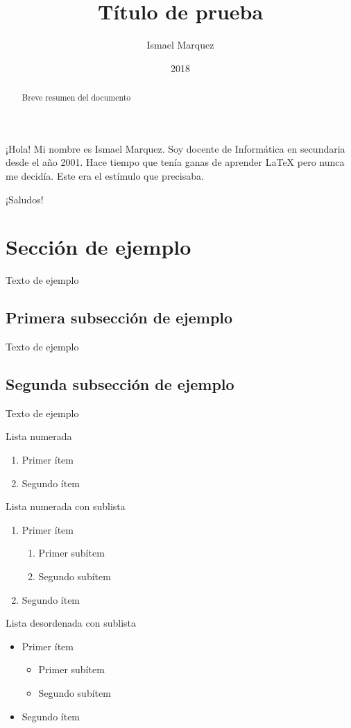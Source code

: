 \documentclass[a4paper,11pt]{article}
\title{\textbf{Título de prueba}}
\author{Ismael Marquez}
\date{2018}
\begin{document}
\maketitle
\thispagestyle{fancy}
\begin{abstract}
Breve resumen del documento
\end{abstract}

¡Hola! Mi nombre es Ismael Marquez. Soy docente de Informática en secundaria desde el año 2001. Hace tiempo que tenía ganas de aprender {\LaTeX} pero nunca me decidía. Este era el estímulo que precisaba.

¡Saludos!

\section{Sección de ejemplo}
Texto de ejemplo
\subsection{Primera subsección de ejemplo}
Texto de ejemplo
\subsection{Segunda subsección de ejemplo}
Texto de ejemplo

Lista numerada
\begin{enumerate}
\item Primer ítem
\item Segundo ítem
\end{enumerate}

Lista numerada con sublista
\begin{enumerate}
\item Primer ítem
\begin{enumerate}
\item Primer subítem
\item Segundo subítem
\end{enumerate}
\item Segundo ítem
\end{enumerate}

Lista desordenada con sublista
\begin{itemize}
\item Primer ítem
\begin{itemize}
\item Primer subítem
\item Segundo subítem
\end{itemize}
\item Segundo ítem
\end{itemize}
\end{document}
